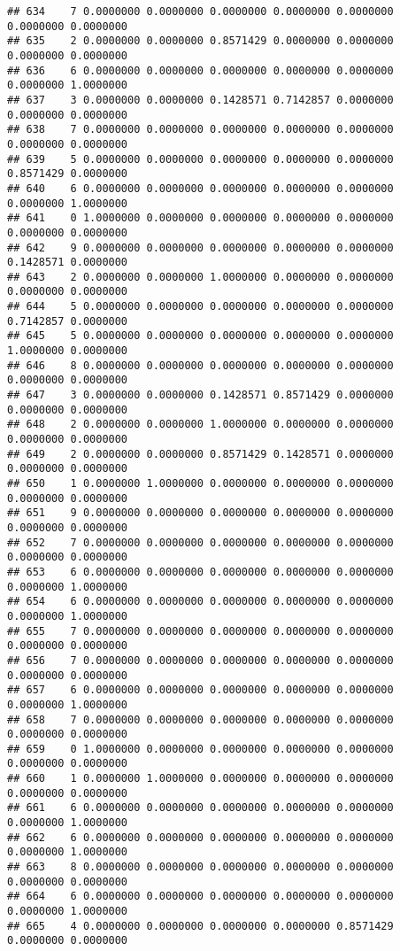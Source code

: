 \documentclass[
]{article}
\begin{document}
\begin{verbatim}
## 634    7 0.0000000 0.0000000 0.0000000 0.0000000 0.0000000 0.0000000 0.0000000
## 635    2 0.0000000 0.0000000 0.8571429 0.0000000 0.0000000 0.0000000 0.0000000
## 636    6 0.0000000 0.0000000 0.0000000 0.0000000 0.0000000 0.0000000 1.0000000
## 637    3 0.0000000 0.0000000 0.1428571 0.7142857 0.0000000 0.0000000 0.0000000
## 638    7 0.0000000 0.0000000 0.0000000 0.0000000 0.0000000 0.0000000 0.0000000
## 639    5 0.0000000 0.0000000 0.0000000 0.0000000 0.0000000 0.8571429 0.0000000
## 640    6 0.0000000 0.0000000 0.0000000 0.0000000 0.0000000 0.0000000 1.0000000
## 641    0 1.0000000 0.0000000 0.0000000 0.0000000 0.0000000 0.0000000 0.0000000
## 642    9 0.0000000 0.0000000 0.0000000 0.0000000 0.0000000 0.1428571 0.0000000
## 643    2 0.0000000 0.0000000 1.0000000 0.0000000 0.0000000 0.0000000 0.0000000
## 644    5 0.0000000 0.0000000 0.0000000 0.0000000 0.0000000 0.7142857 0.0000000
## 645    5 0.0000000 0.0000000 0.0000000 0.0000000 0.0000000 1.0000000 0.0000000
## 646    8 0.0000000 0.0000000 0.0000000 0.0000000 0.0000000 0.0000000 0.0000000
## 647    3 0.0000000 0.0000000 0.1428571 0.8571429 0.0000000 0.0000000 0.0000000
## 648    2 0.0000000 0.0000000 1.0000000 0.0000000 0.0000000 0.0000000 0.0000000
## 649    2 0.0000000 0.0000000 0.8571429 0.1428571 0.0000000 0.0000000 0.0000000
## 650    1 0.0000000 1.0000000 0.0000000 0.0000000 0.0000000 0.0000000 0.0000000
## 651    9 0.0000000 0.0000000 0.0000000 0.0000000 0.0000000 0.0000000 0.0000000
## 652    7 0.0000000 0.0000000 0.0000000 0.0000000 0.0000000 0.0000000 0.0000000
## 653    6 0.0000000 0.0000000 0.0000000 0.0000000 0.0000000 0.0000000 1.0000000
## 654    6 0.0000000 0.0000000 0.0000000 0.0000000 0.0000000 0.0000000 1.0000000
## 655    7 0.0000000 0.0000000 0.0000000 0.0000000 0.0000000 0.0000000 0.0000000
## 656    7 0.0000000 0.0000000 0.0000000 0.0000000 0.0000000 0.0000000 0.0000000
## 657    6 0.0000000 0.0000000 0.0000000 0.0000000 0.0000000 0.0000000 1.0000000
## 658    7 0.0000000 0.0000000 0.0000000 0.0000000 0.0000000 0.0000000 0.0000000
## 659    0 1.0000000 0.0000000 0.0000000 0.0000000 0.0000000 0.0000000 0.0000000
## 660    1 0.0000000 1.0000000 0.0000000 0.0000000 0.0000000 0.0000000 0.0000000
## 661    6 0.0000000 0.0000000 0.0000000 0.0000000 0.0000000 0.0000000 1.0000000
## 662    6 0.0000000 0.0000000 0.0000000 0.0000000 0.0000000 0.0000000 1.0000000
## 663    8 0.0000000 0.0000000 0.0000000 0.0000000 0.0000000 0.0000000 0.0000000
## 664    6 0.0000000 0.0000000 0.0000000 0.0000000 0.0000000 0.0000000 1.0000000
## 665    4 0.0000000 0.0000000 0.0000000 0.0000000 0.8571429 0.0000000 0.0000000

\end{verbatim}
\end{document}
